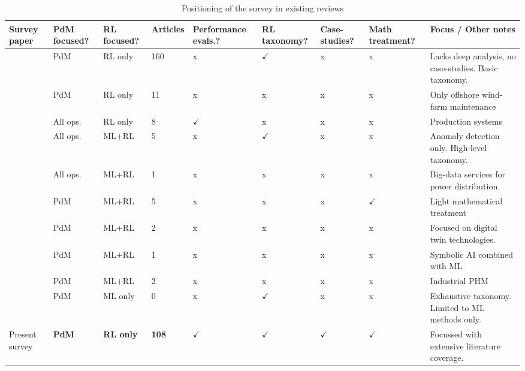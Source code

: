 \documentclass[12pt,oneside]{book}
\renewcommand{\arraystretch}{1.5}
\begin{document}
\begin{landscape}
\begin{table}[p]
	\renewcommand{\arraystretch}{1.3}
	\begin{minipage}{\textwidth}
		\caption{Positioning of the survey in existing reviews}\label{tbl:slr-survey-articles}
		\begin{tabular}{@{}L{4cm} L{1.5cm} L{1.75cm} C{1.2cm} L{2cm} L{1.5cm} L{1cm} L{1.2cm} L{7.5cm} @{} }
			\toprule
			Survey paper &PdM focused?&RL focused?\footnotemark[1]&Articles&Performance evals.?&RL taxonomy?&Case- studies?& Math treatment? & Focus / Other notes\\
			\midrule
			\cite{Net26} & PdM & RL only & 160 & {\sffamily x}&$\checkmark$& {\sffamily x}& {\sffamily x}&Lacks deep analysis, no case-studies. Basic taxonomy.\\
			\cite{Bor26} & PdM&RL only & 11 &{\sffamily x}&{\sffamily x}&{\sffamily x}&{\sffamily x}&Only offshore wind-farm maintenance\\
			\cite{Panzer2021}&All ops.&RL only&8&$\checkmark$&{\sffamily x}&{\sffamily x}&{\sffamily x}&Production systems\\
			\cite{Erhan2021}&All ops.&ML+RL&5&{\sffamily x}&$\checkmark$&{\sffamily x}&{\sffamily x}&Anomaly detection only. High-level taxonomy.\\
			\cite{Barja-Martinez2021}&All ops.&ML+RL&1&{\sffamily x}&{\sffamily x}&{\sffamily x}&{\sffamily x}&Big-data services for power distribution.\\			
			\cite{Ren2021}&PdM&ML+RL&5&{\sffamily x}&{\sffamily x}&{\sffamily x}&$\checkmark$&Light mathematical treatment\\
			\cite{Khan202013}&PdM&ML+RL&2&{\sffamily x}&{\sffamily x}&{\sffamily x}&{\sffamily x}&Focused on digital twin technologies.\\
			\cite{Mattioli2020}&PdM&ML+RL&1&{\sffamily x}&{\sffamily x}&{\sffamily x}&{\sffamily x}&Symbolic AI combined with ML\\
			\cite{Fink2020}&PdM&ML+RL&2&{\sffamily x}&{\sffamily x}&{\sffamily x}&{\sffamily x}&Industrial PHM\\
			\cite{Zonta2020}&PdM&ML only&0&{\sffamily x}&$\checkmark$&{\sffamily x}&{\sffamily x}&Exhaustive taxonomy. Limited to ML methods only.\\
			\midrule
			Present survey&\textbf{PdM}&\textbf{RL only}&\textbf{108}&\quad\textbf{$\checkmark$}&\textbf{$\checkmark$}&\textbf{$\checkmark$}&\textbf{$\checkmark$}&Focussed with extensive literature coverage.\\
		\end{tabular}
	\end{minipage}
\end{table}
\end{landscape}
\restoregeometry
\end{document}
